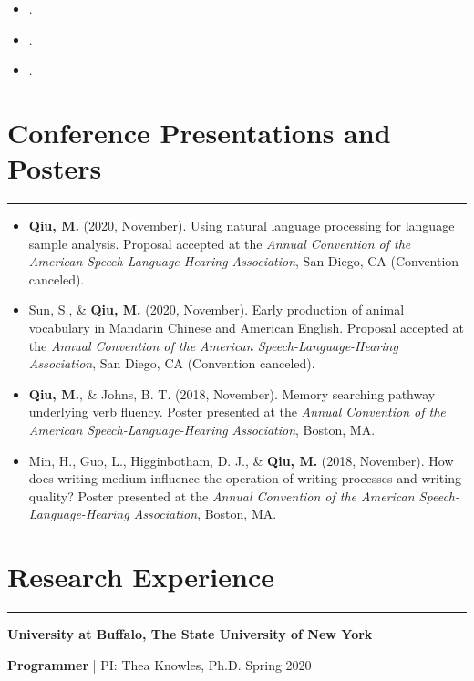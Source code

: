 \documentclass[11pt]{article}
\newcommand{\resumesection}[1]{\vspace{-0.2cm}\section*{#1}\vspace{-0.2cm}\hrule\vspace{0.2cm}}
\begin{document}
\begin{itemize}[leftmargin=!,labelindent=!,itemindent=-15pt]
\setlength\itemsep{0.3em}


\item[] .
\item[] .
\item[] . 
 
\end{itemize}

\resumesection{Conference Presentations and Posters}

\begin{itemize}[leftmargin=!,labelindent=!,itemindent=-15pt]
\setlength\itemsep{0.3em}
\item[] \textbf{Qiu, M.} (2020, November). Using natural language processing for language sample analysis. Proposal accepted at the \textit{Annual Convention of the American Speech-Language-Hearing Association}, San Diego, CA (Convention canceled).

\item[] Sun, S., \& \textbf{Qiu, M.} (2020, November). Early production of animal vocabulary in Mandarin Chinese and American English. Proposal accepted at the \textit{Annual Convention of the American Speech-Language-Hearing Association}, San Diego, CA (Convention canceled).

\item[] \textbf{Qiu, M.}, \& Johns, B. T. (2018, November). Memory searching pathway underlying verb fluency. Poster presented at the \textit{Annual Convention of the American Speech-Language-Hearing Association}, Boston, MA.

\item[] Min, H., Guo, L., Higginbotham, D. J., \& \textbf{Qiu, M.} (2018, November). How does writing medium influence the operation of writing processes and writing quality? Poster presented at the \textit{Annual Convention of the American Speech-Language-Hearing Association}, Boston, MA.

\end{itemize}

\resumesection{Research Experience}
\textbf{University at Buffalo, The State University of New York}

\textbf{Programmer} | PI: Thea Knowles, Ph.D. \hfill Spring 2020
\end{document}
